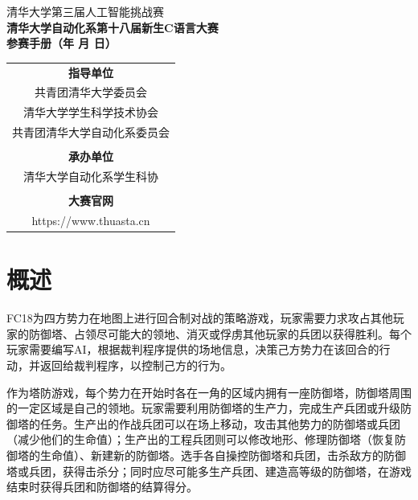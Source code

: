 \documentclass[a4paper,4pt]{article}
\renewcommand{\today}{\number\year 年 \number\month 月 \number\day 日}
\begin{document}
\begin{titlepage}
  \heiti
  \vspace*{20pt}
  \begin{center}
    \fontsize{20pt}{0} {清华大学第三届人工智能挑战赛}\\
    \vspace*{20pt}
    \fontsize{20pt}{0} \textbf{清华大学自动化系第十八届新生C语言大赛}\\
    \vspace*{20pt}
    \fontsize{20pt}{0} \textbf{参赛手册（\today）}\\
    \vspace*{280pt}
    \normalsize
    \rmfamily
    \begin{tabular}{c} %
      \textbf{指导单位}            \\
      共青团清华大学委员会         \\
      清华大学学生科学技术协会     \\
      共青团清华大学自动化系委员会 \\
      \\
      \textbf{承办单位}            \\
      清华大学自动化系学生科协     \\
      \\
      \textbf{大赛官网}            \\
      https://www.thuasta.cn       \\
    \end{tabular}
  \end{center}
\end{titlepage}


\tableofcontents%
\newpage%
\section{概述}
FC18为四方势力在地图上进行回合制对战的策略游戏，玩家需要力求攻占其他玩家的防御塔、占领尽可能大的领地、消灭或俘虏其他玩家的兵团以获得胜利。每个玩家需要编写AI，根据裁判程序提供的场地信息，决策己方势力在该回合的行动，并返回给裁判程序，以控制己方的行为。\par
作为塔防游戏，每个势力在开始时各在一角的区域内拥有一座防御塔，防御塔周围的一定区域是自己的领地。玩家需要利用防御塔的生产力，完成生产兵团或升级防御塔的任务。生产出的作战兵团可以在场上移动，攻击其他势力的防御塔或兵团（减少他们的生命值）；生产出的工程兵团则可以修改地形、修理防御塔（恢复防御塔的生命值）、新建新的防御塔。选手各自操控防御塔和兵团，击杀敌方的防御塔或兵团，获得击杀分；同时应尽可能多生产兵团、建造高等级的防御塔，在游戏结束时获得兵团和防御塔的结算得分。\par
\end{document}
